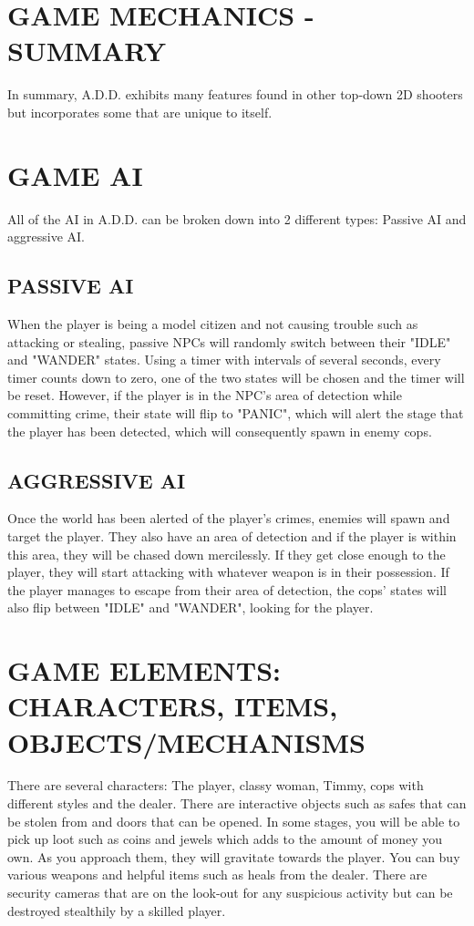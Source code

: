 \documentclass{article}
\begin{document}
\section{GAME MECHANICS - SUMMARY \label{mechanicssumm}}
In summary, A.D.D. exhibits many features found in other top-down 2D shooters but incorporates some that are unique to itself.

\section{GAME AI \label{ai}}
All of the AI in A.D.D. can be broken down into 2 different types: Passive AI and aggressive AI.

\subsection{PASSIVE AI \label{passAI}}
When the player is being a model citizen and not causing trouble such as attacking or stealing, passive NPCs will randomly switch between their "IDLE" and "WANDER" states. Using a timer with intervals of several seconds, every timer counts down to zero, one of the two states will be chosen and the timer will be reset. However, if the player is in the NPC's area of detection while committing crime, their state will flip to "PANIC", which will alert the stage that the player has been detected, which will consequently spawn in enemy cops.

\subsection{AGGRESSIVE AI \label{aggAI}}
Once the world has been alerted of the player's crimes, enemies will spawn and target the player. They also have an area of detection and if the player is within this area, they will be chased down mercilessly. If they get close enough to the player, they will start attacking with whatever weapon is in their possession. If the player manages to escape from their area of detection, the cops' states will also flip between "IDLE" and "WANDER", looking for the player.

\section{GAME ELEMENTS: CHARACTERS, ITEMS, OBJECTS/MECHANISMS \label{elements}}
There are several characters: The player, classy woman, Timmy, cops with different styles and the dealer. There are interactive objects such as safes that can be stolen from and doors that can be opened. In some stages, you will be able to pick up loot such as coins and jewels which adds to the amount of money you own. As you approach them, they will gravitate towards the player. You can buy various weapons and helpful items such as heals from the dealer. There are security cameras that are on the look-out for any suspicious activity but can be destroyed stealthily by a skilled player.
\end{document}
